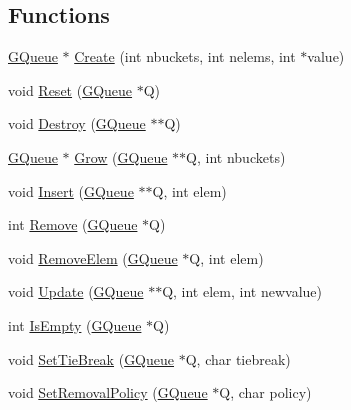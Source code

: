 \subsection*{Functions}
\begin{DoxyCompactItemize}
\item 
\hyperlink{namespacegft_1_1GQueue_a3ed1b095d0e60d83f93c6e9a64a6058d}{G\-Queue} $\ast$ \hyperlink{namespacegft_1_1GQueue_ada76aabe7c7f45bb1f2ce0dac320d60d}{Create} (int nbuckets, int nelems, int $\ast$value)
\item 
void \hyperlink{namespacegft_1_1GQueue_ac3cd561537db894b3171e339eb04e6aa}{Reset} (\hyperlink{namespacegft_1_1GQueue_a3ed1b095d0e60d83f93c6e9a64a6058d}{G\-Queue} $\ast$Q)
\item 
void \hyperlink{namespacegft_1_1GQueue_a787782db0c921364fe5398ed58c11baa}{Destroy} (\hyperlink{namespacegft_1_1GQueue_a3ed1b095d0e60d83f93c6e9a64a6058d}{G\-Queue} $\ast$$\ast$Q)
\item 
\hyperlink{namespacegft_1_1GQueue_a3ed1b095d0e60d83f93c6e9a64a6058d}{G\-Queue} $\ast$ \hyperlink{namespacegft_1_1GQueue_a140f73a8697dab98107203e5f03ad043}{Grow} (\hyperlink{namespacegft_1_1GQueue_a3ed1b095d0e60d83f93c6e9a64a6058d}{G\-Queue} $\ast$$\ast$Q, int nbuckets)
\item 
void \hyperlink{namespacegft_1_1GQueue_a779ac1a5a6a6d1838b6746aa5810bb89}{Insert} (\hyperlink{namespacegft_1_1GQueue_a3ed1b095d0e60d83f93c6e9a64a6058d}{G\-Queue} $\ast$$\ast$Q, int elem)
\item 
int \hyperlink{namespacegft_1_1GQueue_a8a367a688d0492d002bcf8580f33af31}{Remove} (\hyperlink{namespacegft_1_1GQueue_a3ed1b095d0e60d83f93c6e9a64a6058d}{G\-Queue} $\ast$Q)
\item 
void \hyperlink{namespacegft_1_1GQueue_a94432de5a2e09e2e6fb3078cbee92a0d}{Remove\-Elem} (\hyperlink{namespacegft_1_1GQueue_a3ed1b095d0e60d83f93c6e9a64a6058d}{G\-Queue} $\ast$Q, int elem)
\item 
void \hyperlink{namespacegft_1_1GQueue_a9bdc24d4b7e9d5387d1877b21a0eb6f7}{Update} (\hyperlink{namespacegft_1_1GQueue_a3ed1b095d0e60d83f93c6e9a64a6058d}{G\-Queue} $\ast$$\ast$Q, int elem, int newvalue)
\item 
int \hyperlink{namespacegft_1_1GQueue_ada95b281f6340c79a7b6f2836dc3a234}{Is\-Empty} (\hyperlink{namespacegft_1_1GQueue_a3ed1b095d0e60d83f93c6e9a64a6058d}{G\-Queue} $\ast$Q)
\item 
void \hyperlink{namespacegft_1_1GQueue_a282cf644c1eb0eeb45629aec9106924d}{Set\-Tie\-Break} (\hyperlink{namespacegft_1_1GQueue_a3ed1b095d0e60d83f93c6e9a64a6058d}{G\-Queue} $\ast$Q, char tiebreak)
\item 
void \hyperlink{namespacegft_1_1GQueue_a68628a2261a578d86340f57766a7bad6}{Set\-Removal\-Policy} (\hyperlink{namespacegft_1_1GQueue_a3ed1b095d0e60d83f93c6e9a64a6058d}{G\-Queue} $\ast$Q, char policy)
\end{DoxyCompactItemize}


